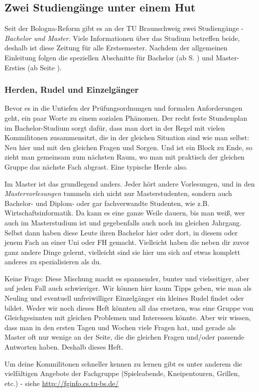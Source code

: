 \begin{multicols}{2}
\subsection{Zwei Studiengänge unter einem Hut}
	Seit der Bologna-Reform gibt es an der TU Braunschweig zwei Studiengänge - \textit{Bachelor und Master}. Viele Informationen über das Studium betreffen beide, deshalb ist diese Zeitung für alle Erstsemester. Nachdem der allgemeinen Einleitung folgen die speziellen Abschnitte für Bachelor (ab S. \pageref{bachelor}) und Master-Ersties (ab Seite \pageref{master}).

\subsubsection{Herden, Rudel und Einzelgänger}
	Bevor es in die Untiefen der Prüfungsordnungen und formalen Anforderungen geht, ein paar Worte zu einem sozialen Phänomen. Der recht feste Stundenplan im Bachelor-Studium sorgt dafür, dass man dort in der Regel mit vielen Kommilitonen zusammensitzt, die in der gleichen Situation sind wie man selbst: Neu hier und mit den gleichen Fragen und Sorgen. Und ist ein Block zu Ende, so zieht man gemeinsam zum nächsten Raum, wo man mit praktisch der gleichen Gruppe das nächste Fach abgrast. Eine typische Herde also.

	Im Master ist das grundlegend anders. Jeder hört andere Vorlesungen, und in den \emph{Mastervorlesungen} tummeln sich nicht nur Masterstudenten, sondern auch Bachelor- und Diplom- oder gar fachverwandte Studenten, wie z.B. Wirtschaftsinformatik. Da kann es eine ganze Weile dauern, bis man weiß, wer auch im Masterstudium ist und gegebenfalls auch noch im gleichen Jahrgang. Selbst dann haben diese Leute ihren Bachelor hier oder dort, in diesem oder jenem Fach an einer Uni oder FH gemacht. Vielleicht haben die neben dir zuvor ganz andere Dinge gelernt, vielleicht sind sie hier um sich auf etwas komplett anderes zu spezialisieren als du.

	Keine Frage: Diese Mischung macht es spannender, bunter und vielseitiger, aber auf jeden Fall auch schwieriger. Wir können hier kaum Tipps geben, wie man als Neuling und eventuell unfreiwilliger Einzelgänger ein kleines Rudel findet oder bildet. Weder wir noch dieses Heft könnten all das ersetzen, was eine Gruppe von Gleichgesinnten mit gleichen Problemen und Interessen könnte. Aber wir wissen, dass man in den ersten Tagen und Wochen viele Fragen hat, und gerade als Master oft nur wenige an der Seite, die die gleichen Fragen und/oder passende Antworten haben. Deshalb dieses Heft.

	Um deine Kommilitonen schneller kennen zu lernen gibt es unter anderem die vielfältigen Angebote der Fachgruppe (Spieleabende, Kneipentouren, Grillen, etc.) - siehe \url{http://fginfo.cs.tu-bs.de/}
\end{multicols}